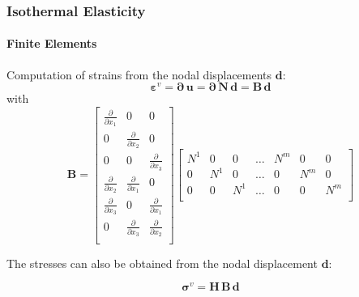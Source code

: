 \documentclass[10pt,xcolor=pdftex,dvipsnames,table]{beamer}
\begin{document}
\begin{frame}
	\frametitle{ Isothermal Elasticity }
	\framesubtitle{ Finite Elements }
	
	Computation of strains from the nodal displacements $\boldsymbol{d}$:
	\begin{equation*}
		\boldsymbol{\varepsilon}^v = \boldsymbol{\partial}\,\boldsymbol{u} = 	\boldsymbol{\partial}\,\mathbf{N}\,\boldsymbol{d} = \mathbf{B}\,\boldsymbol{d}
	\end{equation*}		
	with
	\begin{equation*}
	\mathbf{B} =
		\begin{bmatrix}
			\frac{\partial}{\partial x_1} & 0 & 0 \\
			0 &\frac{\partial}{\partial x_2} &  0 \\
			0 & 0 & \frac{\partial}{\partial x_3}  \\
			\frac{\partial}{\partial x_2} & \frac{\partial}{\partial x_1} & 0  \\
			\frac{\partial}{\partial x_3} & 0 & \frac{\partial}{\partial x_1}  \\
			0 & \frac{\partial}{\partial x_3} & \frac{\partial}{\partial x_2}  \\
		\end{bmatrix}
		\begin{bmatrix}
			N^1 & 0   & 0   &  \dots & N^m & 0 & 0 \\
			0   & N^1 & 0   &  \dots & 0 & N^m & 0  \\
			0   & 0   & N^1 &  \dots & 0 & 0 & N^m  \\
		\end{bmatrix}	
	\end{equation*}
	
	
		
	The stresses can also be obtained from the nodal displacement $\boldsymbol{d}$: 

	\begin{equation*}
		\boldsymbol{\sigma}^v = \mathbf{H}\,\mathbf{B}\,\boldsymbol{d}
	\end{equation*}		
	
\end{frame}
\end{document}
